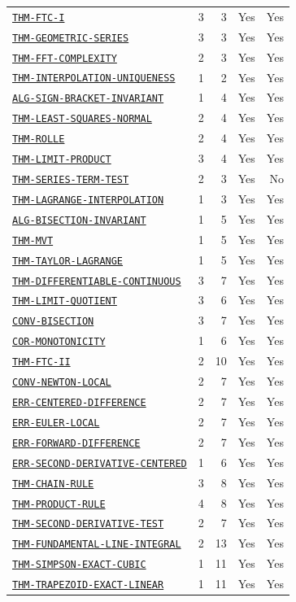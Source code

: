 \documentclass[10pt]{article}
\newcommand{\pidraw}[1]{\begingroup\urlstyle{tt}\nolinkurl{#1}\endgroup}
\newcommand{\pidref}[1]{\hyperref[prf:#1]{\pidraw{#1}}}
\theoremstyle{definition}
\theoremstyle{remark}
\begin{document}
\begin{landscape}
\begin{longtable}{@{}lrrrr@{}}
\pidref{THM-FTC-I} & 3 & 3 & Yes & Yes \\
\pidref{THM-GEOMETRIC-SERIES} & 3 & 3 & Yes & Yes \\
\pidref{THM-FFT-COMPLEXITY} & 2 & 3 & Yes & Yes \\
\pidref{THM-INTERPOLATION-UNIQUENESS} & 1 & 2 & Yes & Yes \\
\pidref{ALG-SIGN-BRACKET-INVARIANT} & 1 & 4 & Yes & Yes \\
\pidref{THM-LEAST-SQUARES-NORMAL} & 2 & 4 & Yes & Yes \\
\pidref{THM-ROLLE} & 2 & 4 & Yes & Yes \\
\pidref{THM-LIMIT-PRODUCT} & 3 & 4 & Yes & Yes \\
\pidref{THM-SERIES-TERM-TEST} & 2 & 3 & Yes & No \\
\pidref{THM-LAGRANGE-INTERPOLATION} & 1 & 3 & Yes & Yes \\
\pidref{ALG-BISECTION-INVARIANT} & 1 & 5 & Yes & Yes \\
\pidref{THM-MVT} & 1 & 5 & Yes & Yes \\
\pidref{THM-TAYLOR-LAGRANGE} & 1 & 5 & Yes & Yes \\
\pidref{THM-DIFFERENTIABLE-CONTINUOUS} & 3 & 7 & Yes & Yes \\
\pidref{THM-LIMIT-QUOTIENT} & 3 & 6 & Yes & Yes \\
\pidref{CONV-BISECTION} & 3 & 7 & Yes & Yes \\
\pidref{COR-MONOTONICITY} & 1 & 6 & Yes & Yes \\
\pidref{THM-FTC-II} & 2 & 10 & Yes & Yes \\
\pidref{CONV-NEWTON-LOCAL} & 2 & 7 & Yes & Yes \\
\pidref{ERR-CENTERED-DIFFERENCE} & 2 & 7 & Yes & Yes \\
\pidref{ERR-EULER-LOCAL} & 2 & 7 & Yes & Yes \\
\pidref{ERR-FORWARD-DIFFERENCE} & 2 & 7 & Yes & Yes \\
\pidref{ERR-SECOND-DERIVATIVE-CENTERED} & 1 & 6 & Yes & Yes \\
\pidref{THM-CHAIN-RULE} & 3 & 8 & Yes & Yes \\
\pidref{THM-PRODUCT-RULE} & 4 & 8 & Yes & Yes \\
\pidref{THM-SECOND-DERIVATIVE-TEST} & 2 & 7 & Yes & Yes \\
\pidref{THM-FUNDAMENTAL-LINE-INTEGRAL} & 2 & 13 & Yes & Yes \\
\pidref{THM-SIMPSON-EXACT-CUBIC} & 1 & 11 & Yes & Yes \\
\pidref{THM-TRAPEZOID-EXACT-LINEAR} & 1 & 11 & Yes & Yes \\

\end{longtable}
\end{landscape}
\end{document}
